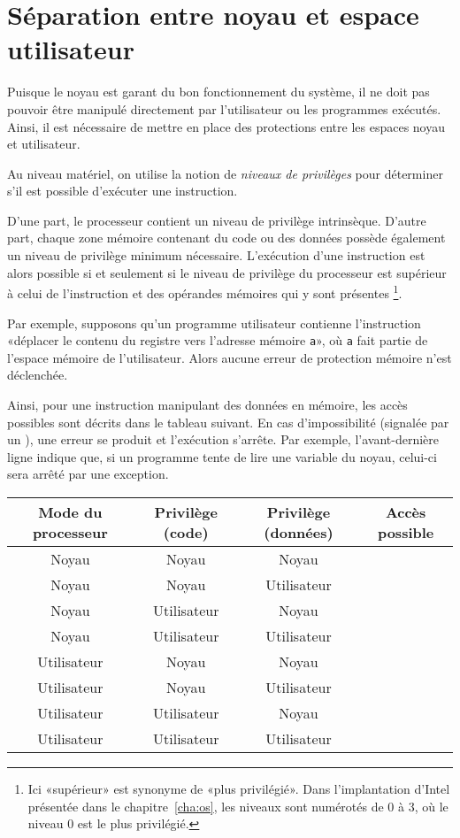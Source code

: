 \section{Séparation entre noyau et espace utilisateur}

Puisque le noyau est garant du bon fonctionnement du système, il ne doit pas
pouvoir être manipulé directement par l'utilisateur ou les programmes exécutés.
Ainsi, il est nécessaire de mettre en place des protections entre les espaces
noyau et utilisateur.

Au niveau matériel, on utilise la notion de \emph{niveaux de privilèges} pour
déterminer s'il est possible d'exécuter une instruction.

D'une part, le processeur contient un niveau de privilège intrinsèque. D'autre
part, \linebreak chaque zone mémoire contenant du code ou des données possède
également un niveau de privilège minimum nécessaire. L'exécution d'une
instruction est alors possible si et seulement si le niveau de privilège du
processeur est supérieur à celui de l'instruction et des opérandes mémoires qui
y sont présentes
\footnote{
  Ici «supérieur» est synonyme de «plus privilégié». Dans l'implantation
  d'Intel présentée dans le chapitre~\ref{cha:os}, les niveaux sont numérotés de
  0 à 3, où le niveau 0 est le plus privilégié.
}.

Par exemple, supposons qu'un programme utilisateur contienne l'instruction
«déplacer le contenu du registre \eax{} vers l'adresse mémoire \texttt{a}», où
\texttt{a} fait partie de l'espace mémoire de l'utilisateur. Alors aucune erreur
de protection mémoire n'est déclenchée.

Ainsi, pour une instruction manipulant des données en mémoire, les accès
possibles sont décrits dans le tableau suivant. En cas d'impossibilité (signalée
par un \Square), une erreur se produit et l'exécution s'arrête. Par exemple,
l'avant-dernière ligne indique que, si un programme tente de lire une variable du
noyau, celui-ci sera arrêté par une exception.

\begin{center}
\def\modeK{Noyau\xspace}
\def\modeU{Utilisateur\xspace}
\begin{tabular}{cccc}
\toprule
  Mode du processeur
& Privilège (code)
& Privilège (données)
& Accès possible \\
\midrule
  \modeK{} & \modeK{} & \modeK{} & \CheckedBox{} \\
  \modeK{} & \modeK{} & \modeU{} & \CheckedBox{} \\
  \modeK{} & \modeU{} & \modeK{} & \CheckedBox{} \\
  \modeK{} & \modeU{} & \modeU{} & \CheckedBox{} \\
  \modeU{} & \modeK{} & \modeK{} & \Square{} \\
  \modeU{} & \modeK{} & \modeU{} & \Square{} \\
  \modeU{} & \modeU{} & \modeK{} & \Square{} \\
  \modeU{} & \modeU{} & \modeU{} & \CheckedBox{} \\
\bottomrule
\end{tabular}
\end{center}
\label{page:erreursec}


